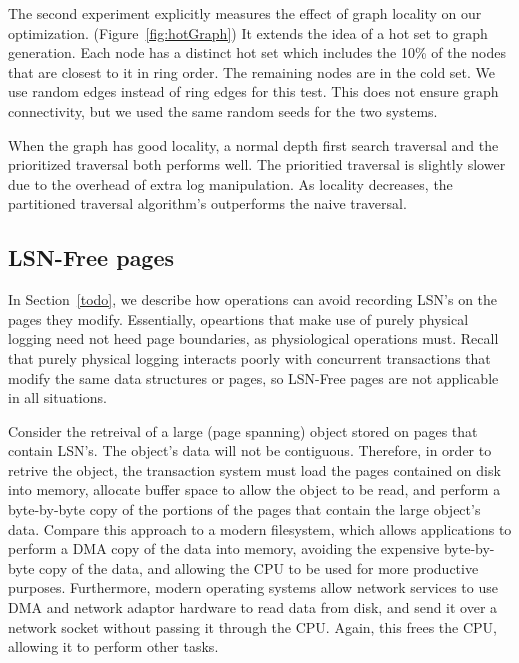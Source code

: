 \documentclass[letterpaper,twocolumn,10pt]{article}
\begin{document}
The second experiment explicitly measures the effect of graph locality
on our optimization. (Figure~\ref{fig:hotGraph}) It extends the idea
of a hot set to graph generation.  Each node has a distinct hot set
which includes the 10\% of the nodes that are closest to it in ring
order.  The remaining nodes are in the cold set.  We use random edges
instead of ring edges for this test.  This does not ensure graph
connectivity, but we used the same random seeds for the two systems.

When the graph has good locality, a normal depth first search
traversal and the prioritized traversal both performs well.  The
prioritied traversal is slightly slower due to the overhead of extra
log manipulation. As locality decreases, the partitioned traversal
algorithm's outperforms the naive traversal.


\subsection{LSN-Free pages}
\label{sec:zeroCopy}
In Section~\ref{todo}, we describe how operations can avoid recording
LSN's on the pages they modify.  Essentially, opeartions that make use
of purely physical logging need not heed page boundaries, as
physiological operations must.  Recall that purely physical logging
interacts poorly with concurrent transactions that modify the same
data structures or pages, so LSN-Free pages are not applicable in all
situations.

Consider the retreival of a large (page spanning) object stored on
pages that contain LSN's.  The object's data will not be contiguous.
Therefore, in order to retrive the object, the transaction system must
load the pages contained on disk into memory, allocate buffer space to
allow the object to be read, and perform a byte-by-byte copy of the
portions of the pages that contain the large object's data.  Compare
this approach to a modern filesystem, which allows applications to
perform a DMA copy of the data into memory, avoiding the expensive
byte-by-byte copy of the data, and allowing the CPU to be used for
more productive purposes.  Furthermore, modern operating systems allow
network services to use DMA and network adaptor hardware to read data
from disk, and send it over a network socket without passing it
through the CPU.  Again, this frees the CPU, allowing it to perform
other tasks.
\end{document}
